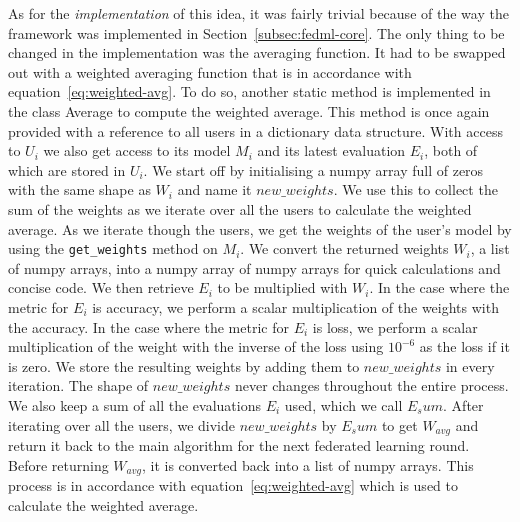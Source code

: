 \documentclass[12pt]{article}
\begin{document}
As for the \textit{implementation} of this idea, it was fairly trivial because of the way the framework was implemented in Section~\ref{subsec:fedml-core}. The only thing to be changed in the implementation was the averaging function. It had to be swapped out with a weighted averaging function that is in accordance with equation~\ref{eq:weighted-avg}. To do so, another static method is implemented in the class Average to compute the weighted average. This method is once again provided with a reference to all users in a dictionary data structure. With access to $U_i$ we also get access to its model $M_i$ and its latest evaluation $E_i$, both of which are stored in $U_i$. We start off by initialising a numpy array full of zeros with the same shape as $W_i$ and name it $new\_weights$. We use this to collect the sum of the weights as we iterate over all the users to calculate the weighted average. As we iterate though the users, we get the weights of the user's model by using the \texttt{get\_weights} method on $M_i$. We convert the returned weights $W_i$, a list of numpy arrays, into a numpy array of numpy arrays for quick calculations and concise code. We then retrieve $E_i$ to be multiplied with $W_i$. In the case where the metric for $E_i$ is accuracy, we perform a scalar multiplication of the weights with the accuracy. In the case where the metric for $E_i$ is loss, we perform a scalar multiplication of the weight with the inverse of the loss using $10^{-6}$ as the loss if it is zero. We store the resulting weights by adding them to $new\_weights$ in every iteration. The shape of $new\_weights$ never changes throughout the entire process. We also keep a sum of all the evaluations $E_i$ used, which we call $E_sum$. After iterating over all the users, we divide $new\_weights$ by $E_sum$ to get $W_{avg}$ and return it back to the main algorithm for the next federated learning round. Before returning $W_{avg}$, it is converted back into a list of numpy arrays. This process is in accordance with equation~\ref{eq:weighted-avg} which is used to calculate the weighted average.
\end{document}
